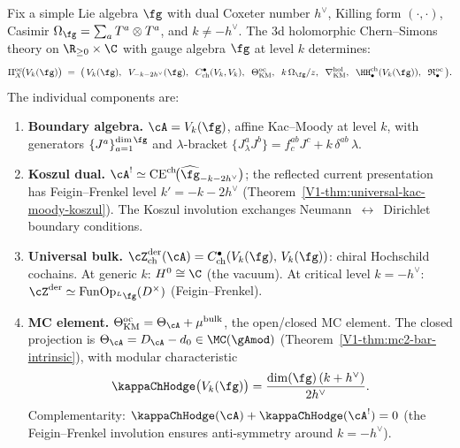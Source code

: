 \begin{computation}
\label{comp:platonic-CS}
Fix a simple Lie algebra $\fg$ with dual Coxeter number $h^\vee$,
Killing form $(\cdot,\cdot)$, Casimir $\Omega_\fg = \sum_a T^a \otimes T^a$,
and $k \ne -h^\vee$. The 3d holomorphic Chern--Simons theory on
$\R_{\ge 0} \times \C$ with gauge algebra $\fg$ at level $k$
determines:
\begin{equation}\label{eq:platonic-CS}
\Pi^{\mathrm{oc}}_X\!\bigl(V_k(\fg)\bigr)
\;=\;
\bigl(\,
V_k(\fg),\;\;
V_{-k-2h^\vee}(\fg),\;\;
C^\bullet_{\mathrm{ch}}(V_k, V_k),\;\;
\Theta^{\mathrm{oc}}_{\mathrm{KM}},\;\;
k\,\Omega_\fg/z,\;\;
\nabla^{\mathrm{hol}}_{\mathrm{KM}},\;\;
\HH^{\mathrm{ch}}_\bullet(V_k(\fg)),\;\;
\mathfrak{R}^{\mathrm{oc}}_\bullet
\,\bigr).
\end{equation}
The individual components are:
\begin{enumerate}[label=\textup{(\roman*)},nosep]
\item \textbf{Boundary algebra.}
 $\cA = V_k(\fg)$, affine Kac--Moody at level $k$, with
 generators $\{J^a\}_{a=1}^{\dim \fg}$ and $\lambda$-bracket
 $\{J^a_\lambda J^b\} = f^{ab}_c J^c + k\,\delta^{ab}\,\lambda$.

\item \textbf{Koszul dual.}
 $\cA^! \simeq
 \operatorname{CE}^{\mathrm{ch}}\!\bigl(\widehat{\fg}_{-k-2h^\vee}\bigr)$;
 the reflected current presentation has Feigin--Frenkel level
 $k' = -k - 2h^\vee$
 \textup{(}Theorem~\textup{\ref*{V1-thm:universal-kac-moody-koszul}}\textup{)}.
 The Koszul involution exchanges
 Neumann~$\leftrightarrow$~Dirichlet boundary conditions.

\item \textbf{Universal bulk.}
 $\cZ^{\mathrm{der}}_{\mathrm{ch}}(\cA) = C^\bullet_{\mathrm{ch}}(V_k(\fg),\, V_k(\fg))$:
 chiral Hochschild cochains. At generic $k$: $H^0 \cong \C$
 (the vacuum). At critical level $k = -h^\vee$:
 $\cZ^{\mathrm{der}} \simeq
 \operatorname{Fun}\!\operatorname{Op}_{{}^L\fg}(D^\times)$
 (Feigin--Frenkel).

\item \textbf{MC element.}
 $\Theta^{\mathrm{oc}}_{\mathrm{KM}} = \Theta_\cA + \mu^{\mathrm{bulk}}$,
 the open/closed MC element. The closed projection is
 $\Theta_\cA = D_\cA - d_0 \in \MC(\gAmod)$
 \textup{(}Theorem~\textup{\ref*{V1-thm:mc2-bar-intrinsic}}\textup{)},
 with modular characteristic
 \begin{equation}\label{eq:platonic-kappa-KM}
 \kappaChHodge\bigl(V_k(\fg)\bigr) = \frac{\dim(\fg)\,(k + h^\vee)}{2h^\vee}.
 \end{equation}
 Complementarity:
 $\kappaChHodge(\cA) + \kappaChHodge(\cA^!) = 0$
 (the Feigin--Frenkel involution ensures
 anti-symmetry around $k = -h^\vee$).


\end{enumerate}
\end{computation}
